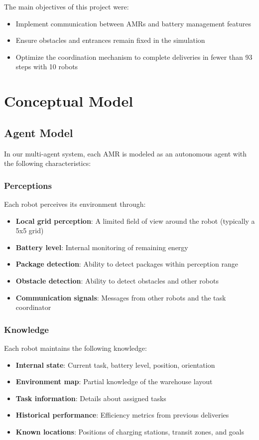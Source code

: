 \documentclass[12pt,a4paper]{article}
\begin{document}
The main objectives of this project were:
\begin{itemize}
    \item Implement communication between AMRs and battery management features
    \item Ensure obstacles and entrances remain fixed in the simulation
    \item Optimize the coordination mechanism to complete deliveries in fewer than 93 steps with 10 robots
\end{itemize}

\section{Conceptual Model}

\subsection{Agent Model}
In our multi-agent system, each AMR is modeled as an autonomous agent with the following characteristics:

\subsubsection{Perceptions}
Each robot perceives its environment through:
\begin{itemize}
    \item \textbf{Local grid perception}: A limited field of view around the robot (typically a 5x5 grid)
    \item \textbf{Battery level}: Internal monitoring of remaining energy
    \item \textbf{Package detection}: Ability to detect packages within perception range
    \item \textbf{Obstacle detection}: Ability to detect obstacles and other robots
    \item \textbf{Communication signals}: Messages from other robots and the task coordinator
\end{itemize}

\subsubsection{Knowledge}
Each robot maintains the following knowledge:
\begin{itemize}
    \item \textbf{Internal state}: Current task, battery level, position, orientation
    \item \textbf{Environment map}: Partial knowledge of the warehouse layout
    \item \textbf{Task information}: Details about assigned tasks
    \item \textbf{Historical performance}: Efficiency metrics from previous deliveries
    \item \textbf{Known locations}: Positions of charging stations, transit zones, and goals
\end{itemize}
\end{document}
